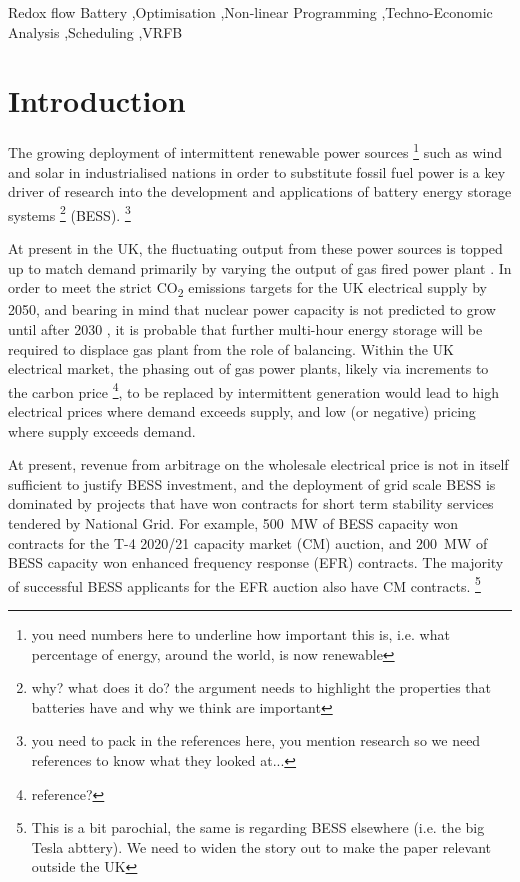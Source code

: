 \documentclass[preprint,3p,review,authoryear,10pt]{elsarticle}
\newcommand{\sol}[1]{\footnote{#1}\marginpar{\fbox{\thefootnote}}}
\begin{document}
\begin{frontmatter}
\begin{abstract}
\end{abstract}

\begin{keyword}
Redox flow Battery \sep Optimisation \sep Non-linear Programming \sep Techno-Economic Analysis \sep Scheduling \sep VRFB  


\end{keyword}

\end{frontmatter}


\section{Introduction}
\label{sec:Intro}
The  growing deployment of intermittent renewable power sources \sol{you need numbers here to underline how important this is, i.e. what percentage of energy, around the world, is now renewable} such as wind and solar in industrialised nations in order to substitute fossil fuel power is a key driver of research into the development and applications of battery energy storage systems \sol{why? what does it do? the argument needs to highlight the properties that batteries have and why we think are important} (BESS). \sol{you need to pack in the references here, you mention research so we need references to know what they looked at...}

At present in the UK, the fluctuating output from these power sources is topped up to match demand primarily by varying the output of gas fired power plant \cite{DraxElectricInsights}. In order to meet the strict CO\textsubscript{2} emissions targets for the UK electrical supply by 2050, and bearing in mind that nuclear power capacity is not predicted to grow until after 2030 \cite{FES2018}, it is probable that further multi-hour energy storage will be required to displace gas plant from the role of balancing.  Within the UK electrical market, the phasing out of gas power plants, likely via increments to the carbon price \sol{reference?}, to be replaced by intermittent generation would lead to high electrical prices where demand exceeds supply, and low (or negative) pricing where supply exceeds demand.

At present, revenue from arbitrage on the wholesale electrical price is not in itself sufficient to justify BESS investment, and the deployment of grid scale BESS is dominated by projects that have won contracts for short term stability services tendered by National Grid. For example, \SI{500}{\mega\watt} of BESS capacity won contracts for the T-4 2020/21 capacity market (CM) auction, and \SI{200}{\mega\watt} of BESS capacity won enhanced frequency response (EFR) contracts. The majority of successful BESS applicants for the EFR auction also have CM contracts. \sol{This is a bit parochial, the same is regarding BESS elsewhere (i.e. the big Tesla abttery). We need to widen the story out to make the paper relevant outside the UK}
\end{document}
